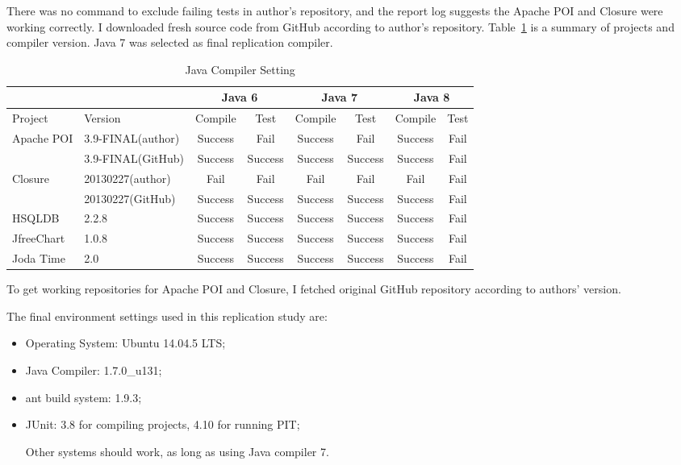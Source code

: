 There was no command to exclude failing tests in author's repository, and the report log suggests the Apache POI and Closure were working correctly. I downloaded fresh source code from GitHub according to author's repository. Table~\ref{tab:sut} is a summary of projects and compiler version. Java 7 was selected as final replication compiler.


\begin{table}
	\caption{Java Compiler Setting}
	\label{tab:sut}
	\begin{minipage}{\columnwidth}
		\begin{center}
			\begin{tabular}{|l|l|c|c|c|c|c|c|}
				\hline
				&&\multicolumn{2}{|c|}{Java 6}&\multicolumn{2}{|c|}{Java 7}&\multicolumn{2}{|c|}{Java 8}\\
				\hline
				Project & Version & Compile & Test & Compile & Test & Compile & Test \\
				\hline
				Apache POI & 3.9-FINAL(author) & Success & Fail & Success & Fail & Success & Fail \\
				& 3.9-FINAL(GitHub) & Success & Success& Success& Success & Success& Fail \\
				\hline
				Closure& 20130227(author) & Fail & Fail & Fail & Fail & Fail & Fail \\
				&20130227(GitHub) & Success & Success & Success & Success & Success & Fail \\
				\hline
				HSQLDB & 2.2.8 & Success & Success & Success & Success & Success & Fail \\
				\hline
				JfreeChart & 1.0.8 & Success & Success & Success & Success & Success & Fail \\
				\hline
				Joda Time & 2.0 & Success & Success & Success & Success & Success & Fail \\
				\hline
			\end{tabular}
		\end{center}
		\bigskip
	\end{minipage}
\end{table}

To get working repositories for Apache POI and Closure, I fetched original GitHub repository according to authors' version.

The final environment settings used in this replication study are:
\begin{itemize}
	\item Operating System: Ubuntu 14.04.5 LTS;
	\item Java Compiler: 1.7.0\_u131;
	\item ant build system: 1.9.3;
	\item JUnit: 3.8 for compiling projects, 4.10 for running PIT;
	
Other systems should work, as long as using Java compiler 7.
\end{itemize}


